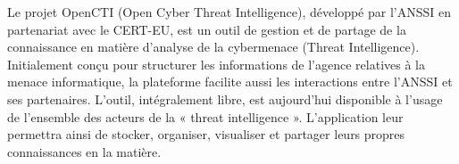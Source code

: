 Le projet OpenCTI (Open Cyber Threat Intelligence), développé par l’ANSSI en partenariat avec le CERT-EU, est un outil de gestion et de partage de la connaissance en matière d’analyse de la cybermenace (Threat Intelligence). Initialement conçu pour structurer les informations de l’agence relatives à la menace informatique, la plateforme facilite aussi les interactions entre l’ANSSI et ses partenaires. L’outil, intégralement libre, est aujourd’hui disponible à l’usage de l’ensemble des acteurs de la « threat intelligence ». L’application leur permettra ainsi de stocker, organiser, visualiser et partager leurs propres connaissances en la matière.